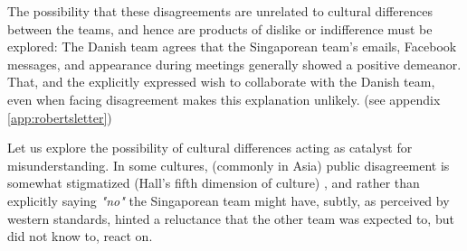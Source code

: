 The possibility that these disagreements are unrelated to cultural differences
between the teams, and hence are products of dislike or indifference must be
explored: The Danish team agrees that the Singaporean team's emails, Facebook messages,
and appearance during meetings generally showed a positive demeanor. That, and
the explicitly expressed wish to collaborate with the Danish team, even when
facing disagreement makes this explanation unlikely. (see appendix
\ref{app:robertsletter})

Let us explore the possibility of cultural differences acting as catalyst for
misunderstanding. In some cultures, (commonly in Asia) public disagreement is
somewhat stigmatized (Hall's fifth dimension of culture\cite{surprises})
\cite{herbsiemens}, and rather than explicitly saying \emph{"no"} the Singaporean team
might have, subtly, as perceived by western standards, hinted a reluctance that
the other team was expected to, but did not know to, react on.

